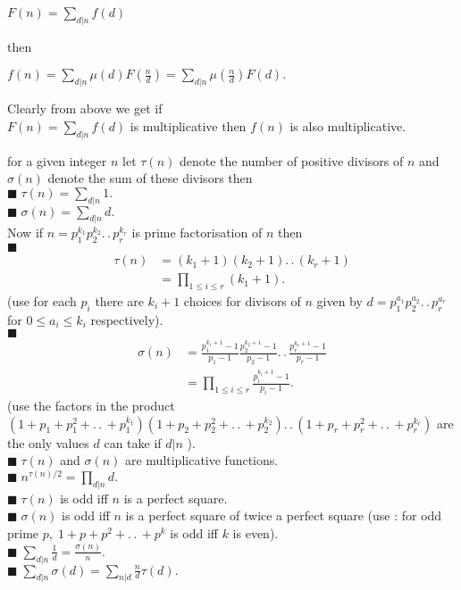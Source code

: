 \documentclass[11pt]{extarticle}
\newcommand{\ck}{.\,.\,}
\newcommand{\sm}[2]{\displaystyle\sum_{#1}^{#2}}
\newcommand{\snote}[1]{{\footnotesize(#1)}}
\newcommand{\tbx}[2][]{
\begin{tcolorbox}[enhanced,breakable,size=small,colback=black!2!white,title={#1},arc is angular, arc=1.5mm,
	drop fuzzy shadow]
	#2
\end{tcolorbox}
}
\newcommand{\y}{$\blacksquare\;$}
\begin{document}
\begin{multicols}{2}
{\begin{center}
 $  F(n)=\sm{d|n}{}f(d) $ 
 \end{center}

then 


\begin{center}
 $ f(n)=\sm{d|n}{} \mu(d)F(\frac{ n }{d})=\sm{d|n}{}\mu(\frac{ n }{d})F(d). $ 
 \end{center}
}
\tbx{
 Clearly from above we get if \\
$  F(n)=\sm{d|n}{}f(d) $ is multiplicative then $ f(n) $ is also multiplicative.}

\newcolumn
\tbx[Positive Divisors function ]{  for a given integer $ n $ let $ \tau(n) $ denote the number of positive divisors of $ n $ and $ \sigma(n) $ denote the sum of these divisors then \\
\y$ \tau(n)=\sm{d|n}{}1. $ \\
\y $ \sigma(n)=\sm{d|n}{}d. $ \\
Now if $ n=p_1^{k_1}p_2^{k_2}\ck p_r^{k_r} $ is prime factorisation of $ n $ then \\
\y\begin{align*}
	\tau(n)&=(k_1+1)(k_2+1)\ck (k_r+1)\\
	&=\displaystyle\prod_{1\leq i\leq r}(k_1+1). 
\end{align*}
\snote{use for each $ p_i $ there are $ k_i+1 $ choices for divisors of $ n $ given by $ d=p_1^{a_1}p_2^{a_2}\ck p_r^{a_r} $ for $ 0\leq a_i \leq k_i $ respectively}. \\
\y \begin{align*}
	\sigma(n)&=\frac{ p_1^{k_1+1}-1 }{p_1-1} \frac{ p_2^{k_2+1}-1 }{p_2-1}\ck \frac{ p_r^{k_r+1}-1 }{p_r-1}\\
	& = \prod\limits_{1\leq i \leq r}^{}\frac{ p_i^{k_i+1}-1 }{p_i-1}.
\end{align*}
\snote{use the factors in the product  $ (1+p_1+p_1^2+\ck +p_1^{k_1})(1+p_2+p_2^2+\ck +p_2^{k_2})\ck (1+p_r+p_r^2+\ck +p_r^{k_r})   $ are the only values $ d $ can take if $ d|n $ }.\\
\y $ \tau(n) $ and $ \sigma(n) $ are multiplicative functions.\\
\y $ n^{\tau(n)/2} =\prod\limits_{d|n}^{} d.$ \\
\y $ \tau(n) $ is odd iff $ n $ is a perfect square.\\
\y $ \sigma(n) $ is odd iff $ n $ is a perfect square of twice a perfect square \snote{use : for odd prime $ p,\; 1+p+p^2+\ck +p^k $ is odd iff $ k $ is even}.\\
\y $ \sm{d|n}{}\frac{ 1 }{d} =\frac{ \sigma(n) }{n} . $ \\
\y $ \sm{d|n}{}\sigma(d)=\sm{n|d}{}\frac{ n }{d} \tau(d). $ }


\end{multicols}
\end{document}
